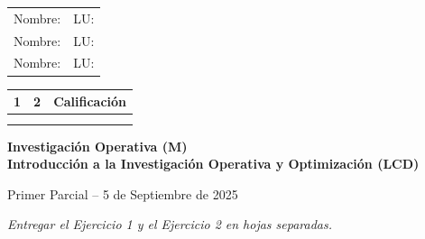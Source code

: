 \documentclass[a4paper,oneside,12pt]{amsart}
\newcommand{\nombremateria}
{Investigaci\'on Operativa (M) \\ Introducción a la Investigación Operativa y Optimización (LCD)}
\newcommand{\numeroparcial}
    { Primer Parcial }
\newcommand{\fecha}
    {5 de Septiembre de 2025}
\theoremstyle{definition}
\begin{document}
    \begin{minipage}[t]{0.55\textwidth}
    \begin{tabularx}{\textwidth}{Xl}
        Nombre: & LU: \hphantom{5cm}\\[0.5em]
        Nombre: & LU: \\[0.5em]
        Nombre: & LU: \\[0.5em]
    \end{tabularx}
    \end{minipage}
    \hfill
    \begin{minipage}[t]{0.35\textwidth}
        \begin{tabular}[c]{|c|c|c|}
            \hline
            1 & 2 & Calificación \\ \hline \hline
            \hspace{1.2 cm} & \hspace{1.2 cm} & \hspace{1.5 cm} \\
            \hspace{1.2 cm} & \hspace{1.2 cm} & \hspace{1.5 cm} \\ \hline
        \end{tabular}
    \end{minipage}

%
%
%

\hrulefill

\smallskip
\renewcommand{\baselinestretch}{1.1}

\begin{center}
	\large \textbf{\nombremateria} 
	
	\numeroparcial -- \fecha
\end{center}

\vspace{.6cm}
\renewcommand{\theenumi}{\textbf{\arabic{enumi}}}

\begin{center}
    \emph{Entregar el Ejercicio 1 y el Ejercicio 2 en hojas separadas.}
\end{center}
\end{document}
